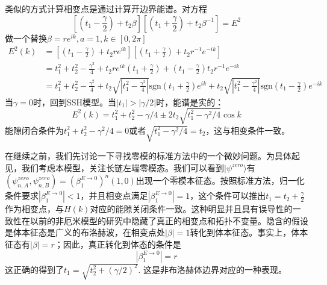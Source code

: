 \documentclass{article}
\begin{document}
类似的方式计算相变点是通过计算开边界能谱。对方程
\begin{equation}
    \left[\left(t_1-\frac{\gamma}{2}\right)+t_2\beta\right]\left[\left(t_1+\frac{\gamma}{2}\right)+t_2\beta^{-1}\right]=E^2
\end{equation}
做一个替换$\beta=r e^{ik},a=1,k\in[0,2\pi]$
\begin{equation}
    \begin{split}
        E^2(k)&=\left[(t_1-\frac{\gamma}{2})+t_2 r e^{ik}\right]\left[(t_1+\frac{\gamma}{2})+t_2 r^{-1}e^{-ik}\right]\\
        &=t_1^2+t_2^2-\frac{\gamma^2}{4}+t_2re^{ik}(t_1+\frac{\gamma}{2})+(t_1-\frac{\gamma}{2})t_2r^{-1}e^{-ik}\\
        &=t_1^2+t_2^2-\frac{\gamma^2}{4}+t_2\sqrt{|t_1^2-\frac{\gamma^2}{4}|}\mathrm{sgn}(t_1+\frac{\gamma}{2})e^{ik}+t_2\sqrt{|t_1^2-\frac{\gamma^2}{4}|}\mathrm{sgn}(t_1-\frac{\gamma}{2})e^{-ik}
    \end{split}
\end{equation}
当$\gamma=0$时，回到SSH模型。当$|t_1|>|\gamma/2|$时，能谱是实的：
\begin{equation}
    E^2(k)=t_1^2+t_2^2-\gamma/4\pm 2t_2\sqrt{t_1^2-\gamma^2/4}\cos k
\end{equation}
能隙闭合条件为$t_1^2+t_2^2-\gamma^2/4=0$或者$\sqrt{t_1^2-\gamma^2/4}=t_2$，这与相变条件一致。

在继续之前，我们先讨论一下寻找零模的标准方法中的一个微妙问题。为具体起见，我们考虑本模型，关注长链左端零模态。我们可以看到$|\psi^{zero}\rangle$有$(\psi_{n,A}^{zero},\psi_{n,B}^{zero})=(\beta_1^{E\to 0})^n(1,0)$出现一个零模本征态。按照标准方法，归一化条件要求$|\beta_1^{E\to 0}|<1$，并且相变点满足$|\beta_1^{E\to 0}|=1$，这个条件可以推出$t_1=t_2+\frac{\gamma}{2}$作为相变点，与$H(k)$对应的能隙关闭条件一致。这种明显并且具有误导性的一致性在以前的非厄米模型的研究中隐藏了真正的相变点和拓扑不变量。隐含的假设是体本征态是广义的布洛赫波，在相变点处$|\beta|=1$转化到体本征态。事实上，体本征态有$|\beta|=r$；因此，真正转化到体态的条件是
\begin{equation}
    |\beta_1^{E\to0}|=r
\end{equation}
这正确的得到了$t_1=\sqrt{t_2^2+(\gamma/2)^2}$. 这是非布洛赫体边界对应的一种表现。
\end{document}
